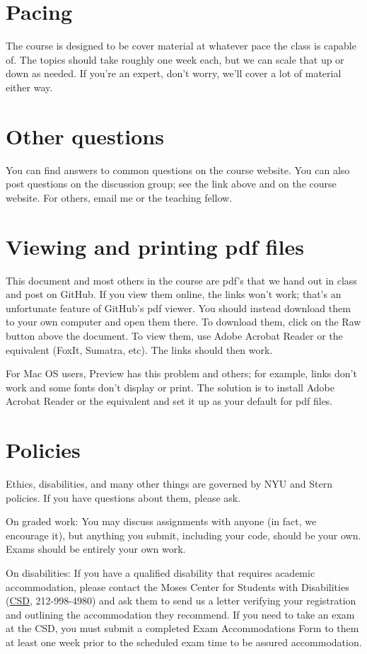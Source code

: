 \section*{Pacing}

The course is designed to be cover material at whatever pace the class is capable of.
The topics should take roughly one week each, but we can scale that up or down as needed.
If you're an expert, don't worry, we'll cover a lot of material either way.


\section*{Other questions}

You can find answers to common questions on the course website. You can also post questions on the discussion group; see the link above and on the course website. For others, email me or the teaching fellow.


\section*{Viewing and printing pdf files}

This document and most others in the course are pdf's that we hand out in class and post on GitHub.
If you view them online, the links won't work; that's an unfortunate feature of GitHub's pdf viewer.
You should instead download them to your own computer and open them there.
To download them, click on the Raw button above the document.
To view them, use Adobe Acrobat Reader or the equivalent (FoxIt, Sumatra, etc).
The links should then work.

For Mac OS users, Preview has this problem and others; for example,
links don't work and some fonts don't display or print.
The solution is to install Adobe Acrobat Reader or the equivalent
and set it up as your default for pdf files.


\section*{Policies}

Ethics, disabilities, and many other things are governed by NYU
and Stern policies.
If you have questions about them, please ask.

On graded work:
You may discuss assignments with anyone (in fact, we encourage it),
but anything you submit, including your code, should be your own.
Exams should be entirely your own work.

On disabilities:
If you have a qualified disability that requires academic accommodation,
please contact the Moses Center for Students with Disabilities
(\href{http://www.nyu.edu/life/safety-health-wellness/students-with-disabilities.html}{CSD},
212-998-4980) and ask them to
send us a letter verifying your registration and outlining the accommodation they recommend.
If you need to take an exam at the CSD,
you must submit a completed Exam Accommodations Form to them
at least one week prior to the scheduled exam time to be assured accommodation.


%



